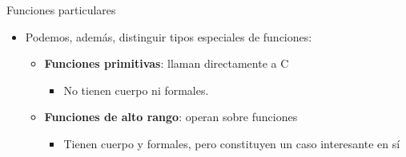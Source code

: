 \documentclass[ignorenonframetext,]{beamer}
\providecommand{\tightlist}{%
  \setlength{\itemsep}{0pt}\setlength{\parskip}{0pt}}
\begin{document}
\begin{frame}{Funciones particulares}
\protect\hypertarget{funciones-particulares}{}

\begin{itemize}
\tightlist
\item
  Podemos, además, distinguir tipos especiales de funciones:

  \begin{itemize}
  \tightlist
  \item
    \textbf{Funciones primitivas}: llaman directamente a C

    \begin{itemize}
    \tightlist
    \item
      No tienen cuerpo ni formales.
    \end{itemize}
  \item
    \textbf{Funciones de alto rango}: operan sobre funciones

    \begin{itemize}
    \tightlist
    \item
      Tienen cuerpo y formales, pero constituyen un caso interesante en
      sí
    \end{itemize}
  \end{itemize}
\end{itemize}

\end{frame}
\end{document}
